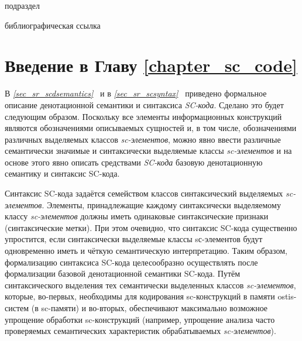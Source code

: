 
\begin{SCn}
	\begin{scnrelfromlist}{подраздел}
	\end{scnrelfromlist}
\end{SCn}

\bigskip

\begin{SCn}
\begin{scnrelfromlist}{библиографическая ссылка}
\end{scnrelfromlist}
\end{SCn}

\section*{Введение в Главу \ref{chapter_sc_code}}
В \textit{\ref{sec_sr_scdsemantics}~} и в \textit{\ref{sec_sr_scsyntax}~} приведено формальное описание денотационной семантики и синтаксиса \textit{SC-кода}. Сделано это будет следующим образом. Поскольку все элементы информационных конструкций являются обозначениями описываемых сущностей и, в том числе, обозначениями различных выделяемых классов \textit{sc-элементов}, можно явно ввести различные семантически значимые и синтаксически выделяемые классы \textit{sc-элементов} и на основе этого явно описать средствами \textit{SC-кода} базовую денотационную семантику и синтаксис SC-кода.
 
Синтаксис SC-кода задаётся семейством классов синтаксический выделяемых \textit{sc-элементов}. Элементы, принадлежащие каждому синтаксически выделяемому классу \textit{sc-элементов} должны иметь одинаковые синтаксические признаки (синтаксические метки). При этом очевидно, что синтаксис SC-кода существенно упростится, если синтаксически выделяемые классы sс-элементов будут одновременно иметь и чёткую семантическую интерпретацию. Таким образом, формализацию синтаксиса SC-кода целесообразно осуществлять после формализации базовой денотационной семантики SC-кода. Путём синтаксического выделения тех семантически выделенных классов \textit{sc-элементов}, которые, во-первых, необходимы для кодирования sc-конструкций в памяти ostis-систем (в sc-памяти) и во-вторых, обеспечивают максимально возможное упрощение обработки sc-конструкций (например, упрощение анализа часто проверяемых семантических характеристик обрабатываемых \textit{sc-элементов}).

